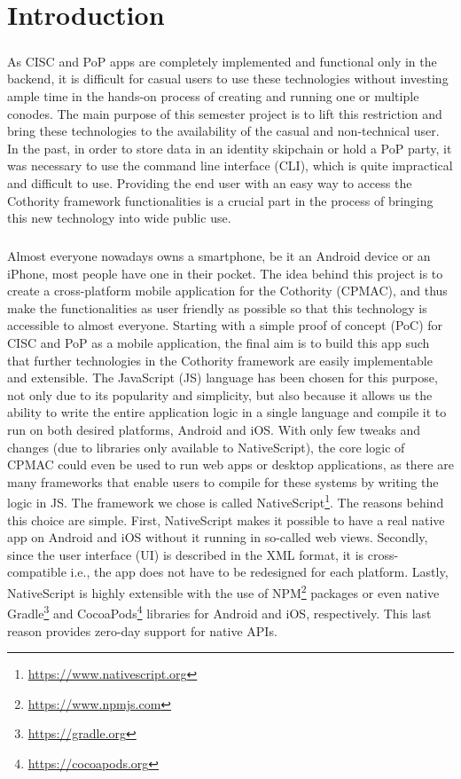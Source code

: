 \chapter{Introduction}
\paragraph{}
As CISC and PoP apps are completely implemented and functional only in the backend, it is difficult for casual users to use these technologies without investing ample time in the hands-on process of creating and running one or multiple conodes. The main purpose of this semester project is to lift this restriction and bring these technologies to the availability of the casual and non-technical user. In the past, in order to store data in an identity skipchain or hold a PoP party, it was necessary to use the command line interface (CLI), which is quite impractical and difficult to use. Providing the end user with an easy way to access the Cothority framework functionalities is a crucial part in the process of bringing this new technology into wide public use.

\paragraph{}
Almost everyone nowadays owns a smartphone, be it an Android device or an iPhone, most people have one in their pocket. The idea behind this project is to create a cross-platform mobile application for the Cothority (CPMAC), and thus make the functionalities as user friendly as possible so that this technology is accessible to almost everyone.
Starting with a simple proof of concept (PoC) for CISC and PoP as a mobile application, the final aim is to build this app such that further technologies in the Cothority framework are easily implementable and extensible. The JavaScript (JS) language has been chosen for this purpose, not only due to its popularity and simplicity, but also because it allows us the ability to write the entire application logic in a single language and compile it to run on both desired platforms, Android and iOS. With only few tweaks and changes (due to libraries only available to NativeScript), the core logic of CPMAC could even be used to run web apps or desktop applications, as there are many frameworks that enable users to compile for these systems by writing the logic in JS. The framework we chose is called NativeScript\footnote{\url{https://www.nativescript.org}}. The reasons behind this choice are simple. First, NativeScript makes it possible to have a real native app on Android and iOS without it running in so-called web views. Secondly, since the user interface (UI) is described in the XML format, it is cross-compatible i.e., the app does not have to be redesigned for each platform. Lastly, NativeScript is highly extensible with the use of NPM\footnote{\url{https://www.npmjs.com}} packages or even native Gradle\footnote{\url{https://gradle.org}} and CocoaPods\footnote{\url{https://cocoapods.org}} libraries for Android and iOS, respectively. This last reason provides zero-day support for native APIs.

